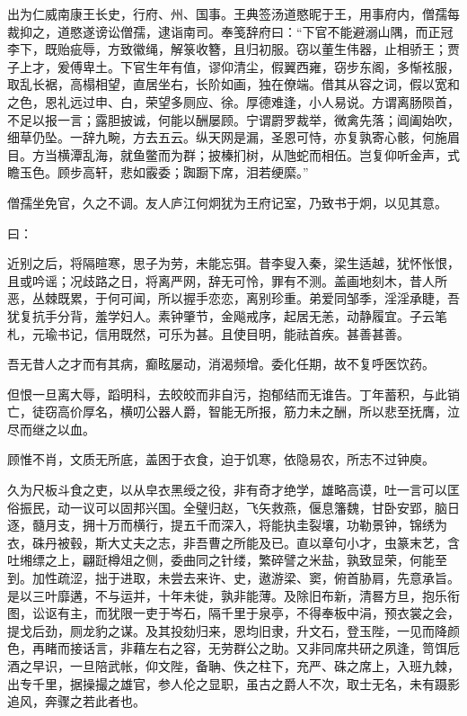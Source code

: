 \documentclass[12pt,UTF8]{ctexbook}
\begin{document}
出为仁威南康王长史，行府、州、国事。王典签汤道愍昵于王，用事府内，僧孺每裁抑之，道愍遂谤讼僧孺，逮诣南司。奉笺辞府曰：“下官不能避溺山隅，而正冠李下，既贻疵辱，方致徽绳，解箓收簪，且归初服。窃以董生伟器，止相骄王；贾子上才，爰傅卑土。下官生年有值，谬仰清尘，假翼西雍，窃步东阁，多惭袨服，取乱长裾，高榻相望，直居坐右，长阶如画，独在僚端。借其从容之词，假以宽和之色，恩礼远过申、白，荣望多厕应、徐。厚德难逢，小人易说。方谓离肠陨首，不足以报一言；露胆披诚，何能以酬屡顾。宁谓罻罗裁举，微禽先落；阊阖始吹，细草仍坠。一辞九畹，方去五云。纵天网是漏，圣恩可恃，亦复孰寄心骸，何施眉目。方当横潭乱海，就鱼鳖而为群；披榛扪树，从虺蛇而相伍。岂复仰听金声，式瞻玉色。顾步高轩，悲如霰委；踟蹰下席，泪若绠縻。”

僧孺坐免官，久之不调。友人庐江何炯犹为王府记室，乃致书于炯，以见其意。

曰：

近别之后，将隔暄寒，思子为劳，未能忘弭。昔李叟入秦，梁生适越，犹怀怅恨，且或吟谣；况歧路之日，将离严网，辞无可怜，罪有不测。盖画地刻木，昔人所恶，丛棘既累，于何可闻，所以握手恋恋，离别珍重。弟爱同邹季，淫淫承睫，吾犹复抗手分背，羞学妇人。素钟肇节，金飚戒序，起居无恙，动静履宜。子云笔札，元瑜书记，信用既然，可乐为甚。且使目明，能祛首疾。甚善甚善。

吾无昔人之才而有其病，癫眩屡动，消渴频增。委化任期，故不复呼医饮药。

但恨一旦离大辱，蹈明科，去皎皎而非自污，抱郁结而无谁告。丁年蓄积，与此销亡，徒窃高价厚名，横叨公器人爵，智能无所报，筋力未之酬，所以悲至抚膺，泣尽而继之以血。

顾惟不肖，文质无所底，盖困于衣食，迫于饥寒，依隐易农，所志不过钟庾。

久为尺板斗食之吏，以从皁衣黑绶之役，非有奇才绝学，雄略高谟，吐一言可以匡俗振民，动一议可以固邦兴国。全璧归赵，飞矢救燕，偃息籓魏，甘卧安郢，脑日逐，髓月支，拥十万而横行，提五千而深入，将能执圭裂壤，功勒景钟，锦绣为衣，硃丹被毂，斯大丈夫之志，非吾曹之所能及已。直以章句小才，虫篆末艺，含吐缃缥之上，翩跹樽俎之侧，委曲同之针缕，繁碎譬之米盐，孰致显荣，何能至到。加性疏涩，拙于进取，未尝去来许、史，遨游梁、窦，俯首胁肩，先意承旨。是以三叶靡遘，不与运并，十年未徙，孰非能薄。及除旧布新，清晷方旦，抱乐衔图，讼讴有主，而犹限一吏于岑石，隔千里于泉亭，不得奉板中涓，预衣裳之会，提戈后劲，厕龙豹之谋。及其投劾归来，恩均旧隶，升文石，登玉陛，一见而降颜色，再睹而接话言，非藉左右之容，无劳群公之助。又非同席共研之夙逢，笥饵卮酒之早识，一旦陪武帐，仰文陛，备聃、佚之柱下，充严、硃之席上，入班九棘，出专千里，据操撮之雄官，参人伦之显职，虽古之爵人不次，取士无名，未有蹑影追风，奔骤之若此者也。
\end{document}

